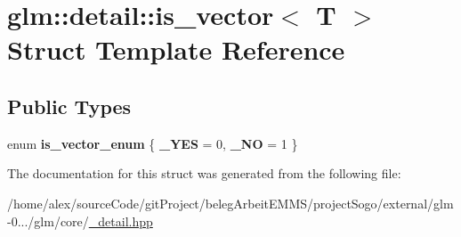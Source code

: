 \hypertarget{structglm_1_1detail_1_1is__vector}{\section{glm\-:\-:detail\-:\-:is\-\_\-vector$<$ T $>$ Struct Template Reference}
\label{structglm_1_1detail_1_1is__vector}
}
\subsection*{Public Types}
\begin{DoxyCompactItemize}
\item 
enum {\bfseries is\-\_\-vector\-\_\-enum} \{ {\bfseries \-\_\-\-Y\-E\-S} = 0, 
{\bfseries \-\_\-\-N\-O} = 1
 \}
\end{DoxyCompactItemize}


The documentation for this struct was generated from the following file\-:\begin{DoxyCompactItemize}
\item 
/home/alex/source\-Code/git\-Project/beleg\-Arbeit\-E\-M\-M\-S/project\-Sogo/external/glm-\/0.../glm/core/\hyperlink{__detail_8hpp}{\-\_\-detail.\-hpp}\end{DoxyCompactItemize}
